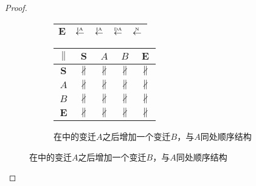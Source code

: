\begin{proof}
\begin{figure}[htbp]
\begin{subfigure}{1\textwidth}
\begin{minipage}[b]{0.3\textwidth}
\begin{tabular}{|c|c|c|c|c|}
        $\bm{E}$ & $\overset{\text{\tiny{IA}}}{\leftarrow}$ & $\overset{\text{\tiny{IA}}}{\leftarrow}$ & $\overset{\text{\tiny{DA}}}{\leftarrow}$ & $\overset{\text{\tiny{N}}}{\leftarrow}$\\ \hline
      \end{tabular}
    \end{minipage}
    \begin{minipage}[b]{0.3\textwidth}
      \vspace{1em}
      \centering
      \begin{tabular}{|c|c|c|c|c|} \hline
        $\parallel$ & $\bm{S}$ & $A$ & $B$ & $\bm{E}$\\ \hline
        $\bm{S}$ & $\nparallel$ & $\nparallel$ & $\nparallel$ & $\nparallel$\\ \hline
        $A$ & $\nparallel$ & $\nparallel$ & $\nparallel$ & $\nparallel$\\ \hline
        $B$ & $\nparallel$ & $\nparallel$ & $\nparallel$ & $\nparallel$\\ \hline
        $\bm{E}$ & $\nparallel$ & $\nparallel$ & $\nparallel$ & $\nparallel$\\ \hline
      \end{tabular}
    \end{minipage}
    \caption{在中的变迁$A$之后增加一个变迁$B$，与$A$同处顺序结构}
    \label{fig:uniqueness_2_b}
  \end{subfigure}


\end{figure}
\end{proof}
